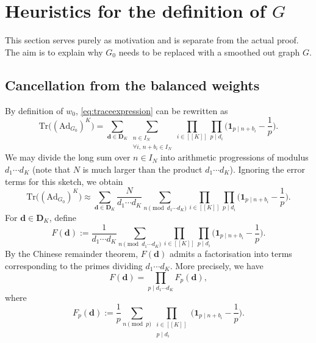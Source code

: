 \documentclass[11pt]{amsart}
\theoremstyle{definition}
\newcommand{\sinterval}[1]{[\![#1]\!] }
\newcommand{\ind}[1]{\mathbf{1}_{#1}}
\newcommand{\Ad}{\mathrm{Ad}}
\newcommand{\Tr}{\mathrm{Tr}}
\newcommand{\N}{I_N}
\renewcommand{\d}{\boldsymbol{d}}
\newcommand{\graph}{G}
\newcommand{\sommespart}{b}
\newcommand{\fancyD}{\mathbf{D}}
\newcommand{\Dsf}{\fancyD_{\!\repK}}
\newcommand{\repK}{K}
\newcommand{\newK}{\sinterval{K}}
\begin{document}
\section{Heuristics for the definition of $\graph$}
\label{sec:heuristics}

This section serves purely as motivation and is separate from the actual proof. The aim is to explain why $\graph_0$ needs to be replaced with a smoothed out graph $\graph$.

\subsection{Cancellation from the balanced weights}
\label{sec:heuristicscancellation}
By definition of $w_0$, \cref{eq:traceexpression} can be rewritten as
\begin{equation}
\label{eq:sketchoriginal}
\Tr \big((\Ad_{\graph_0})^{\repK}\big) = \sum_{\d\in \Dsf}   \sum_{\substack{n\in \N\\ \forall i,\,n+\sommespart_i \in \N}}  \prod_{i\in \newK}  \prod_{p\mid d_i} \bigg(\ind{p\mid n+\sommespart_i} - \frac{1}{p} \bigg).%
\end{equation}
We may divide the long sum over $n\in \N$ into arithmetic progressions of modulus $d_1\cdots d_{\repK}$ (note that $N$ is much larger than the product $d_1\cdots d_{\repK}$). Ignoring the error terms for this sketch, we obtain
\begin{equation}
\label{eq:sketchstepone}
\Tr \big((\Ad_{\graph_0})^{\repK}\big) \approx \sum_{\d\in \Dsf} \frac{N}{d_1\cdots d_{\repK}} \sum_{n \!\!\!\!\! \pmod{d_1\cdots d_{\repK}}}  \prod_{i\in \newK}  \prod_{p\mid d_i} \bigg(\ind{p\mid n+\sommespart_i} - \frac{1}{p} \bigg).
\end{equation}
For $\d \in \Dsf$, define
\begin{equation*}
	F(\d) := \frac{1}{d_1\cdots d_{\repK}} \sum_{n \!\!\!\!\! \pmod{d_1\cdots d_{\repK}}}  \prod_{i\in \newK}  \prod_{p\mid d_i} \bigg(\ind{p\mid n+\sommespart_i} - \frac{1}{p} \bigg).
\end{equation*}
By the Chinese remainder theorem, $F(\d)$ admits a factorisation into terms corresponding to the primes dividing $d_1\cdots d_{\repK}$. More precisely, we have
\begin{equation}
\label{eq:perfectfacto}
	F(\d) = \prod_{p\mid d_1\cdots d_{\repK}} F_p(\d),
\end{equation}
where
\begin{equation}
\label{eq:expressionFp}
	F_p(\d) := \frac{1}{p} \sum_{n \!\!\!\!\!\pmod{p}} \prod_{\substack{i\in \newK \\ p\mid d_i}} \bigg(\ind{p\mid n+\sommespart_i} - \frac{1}{p} \bigg).
\end{equation}
\end{document}
